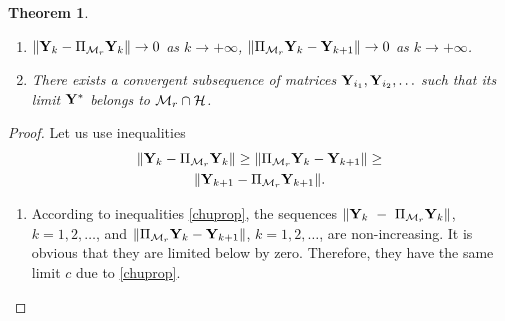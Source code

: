\documentclass[sii]{ipart}
\newtheorem{theorem}{Theorem}
\begin{document}
\begin{theorem}
	\label{th:converg}
	\begin{enumerate}
		Let the space $\calM_r$ be closed in the topology generated by norm $\|\cdot\|$. Then
		\item $\|\mathbf{Y}_k - \Pi_{\mathcal{M}_r}\mathbf{Y}_k\| \to 0$ as $k \to +\infty$, $\|\Pi_{\mathcal{M}_r}\mathbf{Y}_k - \mathbf{Y}_{k+1}\| \to 0$ as $k \to +\infty$.
		\item There exists a convergent subsequence of matrices $\mathbf{Y}_{i_1}, \mathbf{Y}_{i_2}, \ldots$ such that its limit $\mathbf{Y}^*$ belongs to $\mathcal{M}_r \cap \mathcal{H}$.
	\end{enumerate}
\end{theorem}
\begin{proof}
	Let us use inequalities \cite[ineq. (4.1)]{Chu.etal2003}
	\begin{multline}
	\label{chuprop}
	\|\bfY_k - \Pi_{\calM_r} \bfY_k\| \ge \|\Pi_{\calM_r} \bfY_k - \bfY_{k + 1}\| \ge \\ \|\bfY_{k+1} - \Pi_{\calM_r} \bfY_{k + 1}\|.
	\end{multline}
	
	\begin{enumerate}
		\item According to inequalities \eqref{chuprop}, the sequences $\|\mathbf{Y}_k~-~\Pi_{\mathcal{M}_r} \mathbf{Y}_k\|$, $k = 1, 2, \ldots$, and $\|\Pi_{\mathcal{M}_r} \mathbf{Y}_k - \mathbf{Y}_{k + 1}\|$, $k = 1, 2, \ldots$, are non-increasing. It is obvious that they are limited below by zero. Therefore, they have the same limit $c$ due to \eqref{chuprop}.
		

\end{enumerate}
\end{proof}
\end{document}
